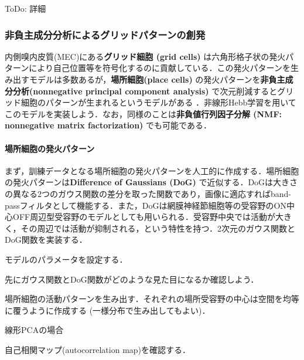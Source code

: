 ToDo: 詳細
\subsubsection{非負主成分分析によるグリッドパターンの創発}
内側嗅内皮質(MEC)にある\textbf{グリッド細胞 (grid cells)} は六角形格子状の発火パターンにより自己位置等を符号化するのに貢献している．この発火パターンを生み出すモデルは多数あるが，\textbf{場所細胞(place cells)} の発火パターンを\textbf{非負主成分分析(nonnegative principal component analysis)} で次元削減するとグリッド細胞のパターンが生まれるというモデルがある \cite{Dordek2016-ff}．非線形Hebb学習を用いてこのモデルを実装しよう．なお，同様のことは\textbf{非負値行列因子分解 (NMF: nonnegative matrix factorization)} でも可能である．
\paragraph{場所細胞の発火パターン}
まず，訓練データとなる場所細胞の発火パターンを人工的に作成する．場所細胞の発火パターンは\textbf{Difference of Gaussians (DoG)} で近似する．DoGは大きさの異なる2つのガウス関数の差分を取った関数であり，画像に適応すればband-passフィルタとして機能する．また，DoGは網膜神経節細胞等の受容野のON中心OFF周辺型受容野のモデルとしても用いられる．受容野中央では活動が大きく，その周辺では活動が抑制される，という特性を持つ．2次元のガウス関数とDoG関数を実装する．

モデルのパラメータを設定する．

先にガウス関数とDoG関数がどのような見た目になるか確認しよう．



場所細胞の活動パターンを生み出す．それぞれの場所受容野の中心は空間を均等に覆うように作成する (一様分布で生み出してもよい)．

線形PCAの場合



自己相関マップ(autocorrelation map)を確認する．


